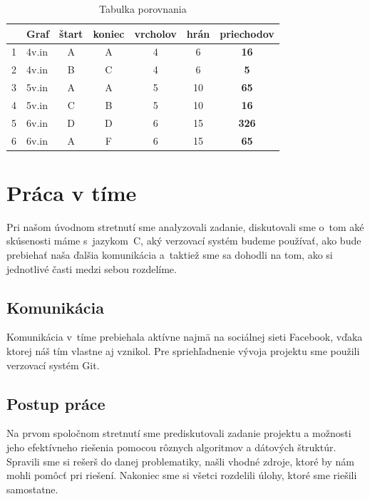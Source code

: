 \documentclass[a4paper,11pt, titlepage]{article}
\begin{document}
\vspace{1cm}

\begin{table}[h]
	\centering
	\begin{tabular}{|l|l|c|c|c|c|c|}
		\hline
		  & Graf  & štart & koniec & vrcholov & hrán & priechodov     \\ \hline
		1 & 4v.in & A     & A     & 4             & 6          & \textbf{16}  \\ \hline
		2 & 4v.in & B     & C     & 4             & 6          & \textbf{5}   \\ \hline
		3 & 5v.in & A     & A     & 5             & 10         & \textbf{65}          \\ \hline
		4 & 5v.in & C     & B     & 5             & 10         & \textbf{16}          \\ \hline
		5 & 6v.in & D     & D     & 6             & 15         & \textbf{326} \\ \hline
		6 & 6v.in & A     & F     & 6             & 15         & \textbf{65}  \\ \hline
	\end{tabular}
	\caption{Tabulka porovnania}
	\label{tab:porovnani}
\end{table}

\section{Práca v tíme}

\par
Pri našom úvodnom stretnutí sme analyzovali zadanie, diskutovali sme o~tom aké skúsenosti máme s~jazykom~C, aký verzovací systém budeme používať, ako bude prebiehať naša ďalšia komunikácia a~taktiež sme sa dohodli na tom, ako si jednotlivé časti medzi sebou rozdelíme.

\subsection{Komunikácia}

Komunikácia v~tíme prebiehala aktívne najmä na sociálnej sieti Facebook, vďaka ktorej náš tím vlastne aj vznikol. Pre spriehľadnenie vývoja projektu sme použili verzovací systém Git. 

\subsection{Postup práce}

Na prvom spoločnom stretnutí sme prediskutovali zadanie projektu a možnosti jeho efektívneho riešenia pomocou rôznych algoritmov a dátových štruktúr. Spravili sme si rešerš do danej problematiky, našli vhodné zdroje, ktoré by nám mohli pomôcť pri riešení. Nakoniec sme si všetci rozdelili úlohy, ktoré sme riešili samostatne. 
\end{document}
